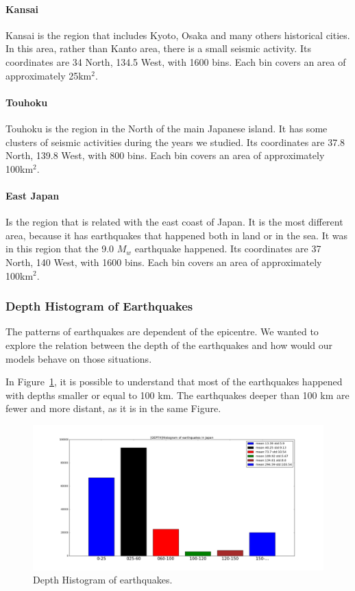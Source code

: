 \paragraph{Kansai} Kansai is the region that includes Kyoto, Osaka and many others historical cities. In this area, rather than Kanto area, there is a small seismic activity. Its coordinates are 34 North, 134.5 West, with 1600 bins. Each bin covers an area of approximately 25km$^2$.

\paragraph{Touhoku} Touhoku is the region in the North of the main Japanese island. It has some clusters of seismic activities during the years we studied. Its coordinates are 37.8 North, 139.8 West, with  800 bins. Each bin covers an area of approximately 100km$^2$. 

\paragraph{East Japan} Is the region that is related with the east coast of Japan. It is the most different area, because it has earthquakes that happened both in land or in the sea. It was in this region that the 9.0 $M_w$ earthquake happened. Its coordinates are 37 North, 140 West, with 1600 bins. Each bin covers an area of approximately 100km$^2$. 

\subsubsection{Depth Histogram of Earthquakes}


The patterns of earthquakes are dependent of the epicentre. We wanted to explore the relation between the depth of the earthquakes and how would our models behave on those situations.

In Figure~\ref{histogramQuakes}, it is possible to understand that most of the earthquakes happened with depths smaller or equal to 100 km. The earthquakes deeper than 100 km are fewer and more distant, as it is in the same Figure.\\

\begin{figure}[]
	\centering
	\includegraphics[scale=0.15]{img/detphsNew.png}
	\caption{Depth Histogram of earthquakes.}
	\label{histogramQuakes}
\end{figure}

